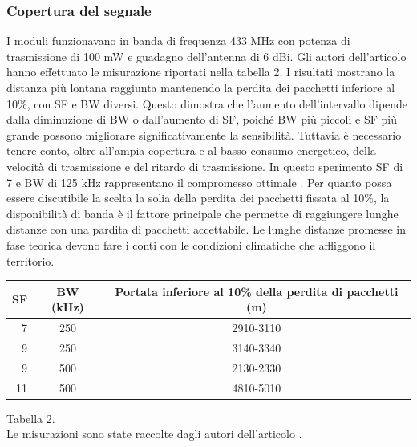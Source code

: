 \documentclass[a4paper]{report} %
\begin{document}
\subsubsection{Copertura del segnale}
I moduli funzionavano in banda di frequenza 433 MHz con potenza di trasmissione di 100 mW e guadagno dell'antenna di 6 dBi. Gli autori dell'articolo \cite{art:rif.44} hanno effettuato le misurazione riportati nella tabella 2. I risultati mostrano la distanza più lontana raggiunta mantenendo la perdita dei pacchetti inferiore al 10\%, con SF e BW diversi. Questo dimostra che l'aumento dell'intervallo dipende dalla diminuzione di BW o dall'aumento di SF, poiché BW più piccoli e SF più grande possono migliorare significativamente la sensibilità. Tuttavia è necessario tenere conto, oltre all'ampia copertura e al basso consumo energetico, della velocità di trasmissione e del ritardo di trasmissione. In questo sperimento SF di 7 e BW di 125 kHz rappresentano il compromesso ottimale \cite{art:rif.44}.
Per quanto possa essere discutibile la scelta la solia della perdita dei pacchetti fissata al 10\%, la disponibilità di banda è il fattore principale che permette di raggiungere lunghe distanze con una pardita di pacchetti accettabile. Le lunghe distanze promesse in fase teorica devono fare i conti con le condizioni climatiche che affliggono il territorio.

\begin{center}
\begin{tabular}{r|c|c|}
SF&BW (kHz)&Portata inferiore al 10\% della perdita di pacchetti (m)\\ \hline
7&250&2910-3110\\ \hline
9&250&3140-3340\\ \hline
9&500&2130-2330\\ \hline
11&500&4810-5010\\ \hline
\end{tabular}
Tabella 2. \\
Le misurazioni sono state raccolte dagli autori dell'articolo \cite{art:rif.44}. \\
\end{center}
\end{document}

